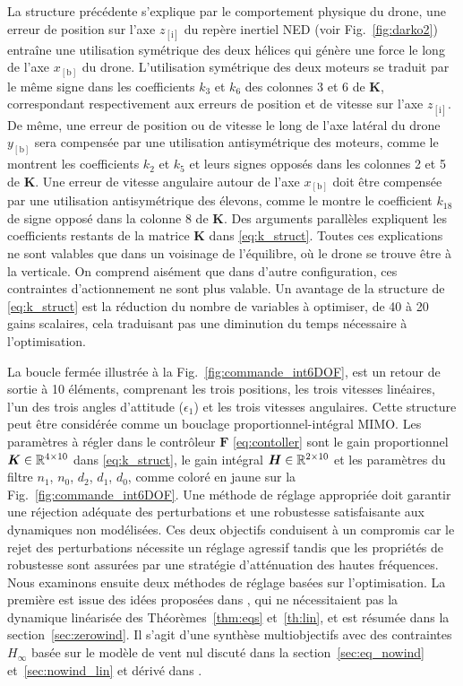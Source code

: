 La structure précédente s'explique par le comportement physique du drone, une erreur de position sur l'axe $z_{[\text{i}]}$ du repère inertiel NED (voir Fig.~\ref{fig:darko2}) entraîne une utilisation symétrique des deux hélices qui génère une force le long de l'axe $x_{[\text{b}]}$ du drone. L'utilisation symétrique des deux moteurs se traduit par le même signe dans les coefficients $k_{3}$ et $k_{6}$ des colonnes 3 et 6 de $\boldsymbol{K}$, correspondant respectivement aux erreurs de position et de vitesse sur l'axe $z_{[\text{i}]}$. De même, une erreur de position ou de vitesse le long de l'axe latéral du drone $y_{[\text{b}]}$ sera compensée par une utilisation antisymétrique des moteurs, comme le montrent les coefficients $k_{2}$ et $k_{5}$ et leurs signes opposés dans les colonnes 2 et 5 de $\boldsymbol{K}$. Une erreur de vitesse angulaire autour de l'axe $x_{[\text{b}]}$ doit être compensée par une utilisation antisymétrique des élevons, comme le montre le coefficient $k_{18}$ de signe opposé dans la colonne 8 de $\boldsymbol{K}$. Des arguments parallèles expliquent les coefficients restants de la matrice $\boldsymbol{K}$ dans \eqref{eq:k_struct}. Toutes ces explications ne sont valables que dans un voisinage de l'équilibre, où le drone se trouve être à la verticale. On comprend aisément que dans d'autre configuration, ces contraintes d'actionnement ne sont plus valable. Un avantage de la structure de \eqref{eq:k_struct} est la réduction du nombre de variables à optimiser, de 40 à 20 gains scalaires, cela traduisant pas une diminution du temps nécessaire à l'optimisation.

La boucle fermée illustrée à la Fig.~\ref{fig:commande_int6DOF}, est un retour de sortie à 10 éléments, comprenant les trois positions, les trois vitesses linéaires, l'un des trois angles d'attitude ($\epsilon_{1}$) et les trois vitesses angulaires. Cette structure peut être considérée comme un bouclage proportionnel-intégral MIMO. Les paramètres à régler dans le contrôleur $\boldsymbol{F}$ \eqref{eq:contoller} sont le gain proportionnel $\boldsymbol{K} \in {\mathbb R}^{4\times10}$ dans \eqref{eq:k_struct}, le gain intégral $\boldsymbol{H} \in {\mathbb R}^{2\times10}$ et les paramètres du filtre $n_1$, $n_0$, $d_2$, $d_1$, $d_0$, comme coloré en jaune sur la Fig.~\ref{fig:commande_int6DOF}. Une méthode de réglage appropriée doit garantir une réjection adéquate des perturbations et une robustesse satisfaisante aux dynamiques non modélisées. Ces deux objectifs conduisent à un compromis car le rejet des perturbations nécessite un réglage agressif tandis que les propriétés de robustesse sont assurées par une stratégie d'atténuation des hautes fréquences. Nous examinons ensuite deux méthodes de réglage basées sur l'optimisation. 
La première est issue des idées proposées dans \cite{SANSOUACA}, qui ne nécessitaient pas la dynamique linéarisée des Théorèmes~\ref{thm:eqs} et~\ref{th:lin}, et est résumée dans la section~\ref{sec:zerowind}. Il s'agit d'une synthèse multiobjectifs avec des contraintes $H_{\infty}$ basée sur le modèle de vent nul discuté dans la section~\ref{sec:eq_nowind} et~\ref{sec:nowind_lin} et dérivé dans \cite{SANSOUACA}.


